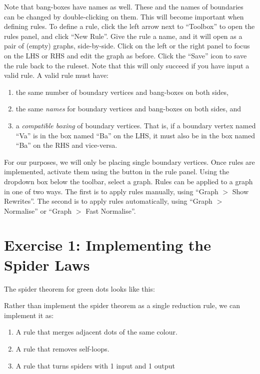 \documentclass{article}
\begin{document}
Note that bang-boxes have names as well. These and the names of boundaries can be changed by double-clicking on them. This will become important when defining rules. To define a rule, click the left arrow next to ``Toolbox'' to open the rules panel, and click ``New Rule''. Give the rule a name, and it will open as a pair of (empty) graphs, side-by-side. Click on the left or the right panel to focus on the LHS or RHS and edit the graph as before. Click the ``Save'' icon to save the rule back to the ruleset. Note that this will only succeed if you have input a valid rule. A valid rule must have:

\begin{enumerate}
  \item the same number of boundary vertices and bang-boxes on both sides,
  \item the same \textit{names} for boundary vertices and bang-boxes on both sides, and
  \item a \textit{compatible boxing} of boundary vertices. That is, if a boundary vertex named ``Va'' is in the box named ``Ba'' on the LHS, it must also be in the box named ``Ba'' on the RHS and vice-versa.
\end{enumerate}

For our purposes, we will only be placing single boundary vertices. Once rules are implemented, activate them using the button in the rule panel. Using the dropdown box below the toolbar, select a graph. Rules can be applied to a graph in one of two ways. The first is to apply rules manually, using ``Graph $>$ Show Rewrites''. The second is to apply rules automatically, using ``Graph $>$ Normalise'' or ``Graph $>$ Fast Normalise''.


\section*{Exercise 1: Implementing the Spider Laws}

The spider theorem for green dots looks like this:

Rather than implement the spider theorem as a single reduction rule, we can implement it as:

\begin{enumerate}
  \item A rule that merges adjacent dots of the same colour.
  \item A rule that removes self-loops.
  \item A rule that turns spiders with 1 input and 1 output
\end{enumerate}
\end{document}
